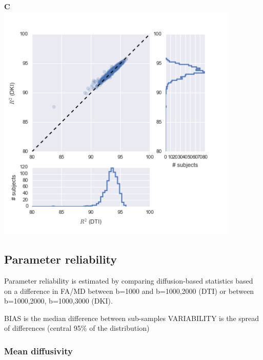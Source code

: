 \documentclass[a0, landscape]{a0poster}
\begin{document}
\begin{multicols}{3}
\begin{minipage}[b]{1\linewidth}
\begin{minipage}[b]{0.33\linewidth}
  \end{minipage}
  \begin{minipage}[b]{0.33\linewidth}
  \textbf{C}\\
  \includegraphics[width=11.5cm]{dti_1000_dki.png}
  \end{minipage}
\end{minipage}

\subsection*{Parameter reliability}

\noindent Parameter reliability is estimated by comparing diffusion-based
statistics based on a difference in FA/MD between b=1000 and b=1000,2000 (DTI)
or between b=1000,2000, b=1000,3000 (DKI).

\noindent BIAS is the median difference between sub-samples VARIABILITY is
the spread of differences (central 95\% of the distribution)

\subsubsection*{Mean diffusivity}


\end{multicols}
\end{document}
